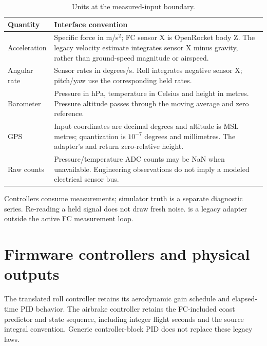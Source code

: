 \begin{table}[htbp]\centering\small
\begin{tabularx}{\linewidth}{@{}L{2.4cm}Y@{}}\toprule
Quantity & Interface convention\\\midrule
Acceleration & Specific force in m/s\(^2\); FC sensor X is OpenRocket body Z. The legacy velocity estimate integrates sensor X minus gravity, rather than ground-speed magnitude or airspeed.\\
Angular rate & Sensor rates in degrees/s. Roll integrates negative sensor X; pitch/yaw use the corresponding held rates.\\
Barometer & Pressure in hPa, temperature in Celsius and height in metres. Pressure altitude passes through the moving average and zero reference.\\
GPS & Input coordinates are decimal degrees and altitude is MSL metres; quantization is \(10^{-7}\) degrees and millimetres. The adapter's  and  return zero-relative height.\\
Raw counts & Pressure/temperature ADC counts may be NaN when unavailable. Engineering observations do not imply a modeled electrical sensor bus.\\
\bottomrule\end{tabularx}
\caption{Units at the measured-input boundary.}
\end{table}
Controllers consume measurements; simulator truth is a separate diagnostic
series. Re-reading a held signal does not draw fresh noise. 
is a legacy adapter outside the active FC measurement loop.

\clearpage
\section{Firmware controllers and physical outputs}
The translated roll controller retains its aerodynamic gain schedule and
elapsed-time PID behavior. The airbrake controller retains the FC-included
coast predictor and state sequence, including integer flight seconds and the
source integral convention. Generic controller-block PID does not replace
these legacy laws.

